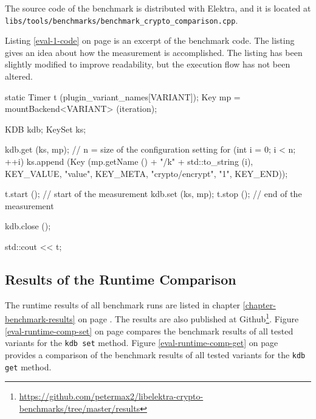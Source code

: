 The source code of the benchmark is distributed with Elektra, and it is located at\\
\texttt{libs/tools/benchmarks/benchmark\_crypto\_comparison.cpp}.

Listing \ref{eval-1-code} on page \pageref{eval-1-code} is an excerpt of the benchmark code.
The listing gives an idea about how the measurement is accomplished.
The listing has been slightly modified to improve readability, but the execution flow has not been altered.

\begin{code}[label=eval-1-code,language=C,caption={Excerpt of Benchmark 1}]
static Timer t (plugin_variant_names[VARIANT]);
Key mp = mountBackend<VARIANT> (iteration);
{
  KDB kdb;
  KeySet ks;

  kdb.get (ks, mp);
  // n = size of the configuration setting
  for (int i = 0; i < n; ++i)
  {
    ks.append (Key (mp.getName () + "/k" + std::to_string (i),
      KEY_VALUE, "value",
      KEY_META, "crypto/encrypt", "1",
      KEY_END));
  }

  t.start (); // start of the measurement
  kdb.set (ks, mp);
  t.stop (); // end of the measurement

  kdb.close ();
}
std::cout << t;
\end{code}

  \subsection{Results of the Runtime Comparison}
  \label{eval-section-runtime-results}

The runtime results of all benchmark runs are listed in chapter \ref{chapter-benchmark-results} on page \pageref{chapter-benchmark-results}.
The results are also published at Github\footnote{\url{https://github.com/petermax2/libelektra-crypto-benchmarks/tree/master/results}}.
Figure \ref{eval-runtime-comp-set} on page \pageref{eval-runtime-comp-set} compares the benchmark results of all tested variants for the \texttt{kdb set} method.
Figure \ref{eval-runtime-comp-get} on page \pageref{eval-runtime-comp-get} provides a comparison of the benchmark results of all tested variants for the \texttt{kdb get} method.


